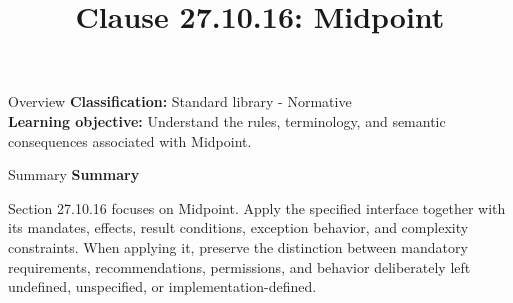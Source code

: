 \documentclass[10pt,letterpaper]{article}
\title{Clause 27.10.16: Midpoint}
\author{}
\date{}
\begin{document}
\maketitle
\begin{CornellOverviewBox}{Overview}
\textbf{Classification:} Standard library - Normative\\[2pt]
\textbf{Learning objective:} Understand the rules, terminology, and semantic consequences associated with Midpoint.
\end{CornellOverviewBox}\begin{CornellSummaryBox}{Summary}
{\sffamily\bfseries\color{Accent} Summary}\par\vspace{3pt}Section 27.10.16 focuses on Midpoint. Apply the specified interface together with its mandates, effects, result conditions, exception behavior, and complexity constraints. When applying it, preserve the distinction between mandatory requirements, recommendations, permissions, and behavior deliberately left undefined, unspecified, or implementation-defined.
\end{CornellSummaryBox}
\end{document}
